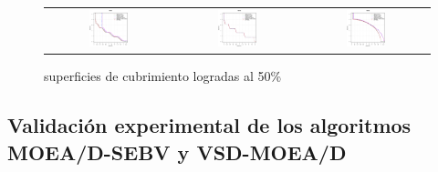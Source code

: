 \begin{figure}[H]
\caption{superficies de cubrimiento logradas al 50\%}%
\label{Fig:AttainmentSurfaces_Mating}
\begin{tabular}{ccc}
  \includegraphics[width=0.33\textwidth]{Figures_Chapter7/Results_Chapter4/Surface_eps/WFG1.eps}  &
  \includegraphics[width=0.33\textwidth]{Figures_Chapter7/Results_Chapter4/Surface_eps/WFG2.eps}  &
  \includegraphics[width=0.33\textwidth]{Figures_Chapter7/Results_Chapter4/Surface_eps/WFG8.eps} 
\end{tabular}
\end{figure}

\subsection{Validación experimental de los algoritmos MOEA/D-SEBV y VSD-MOEA/D}

